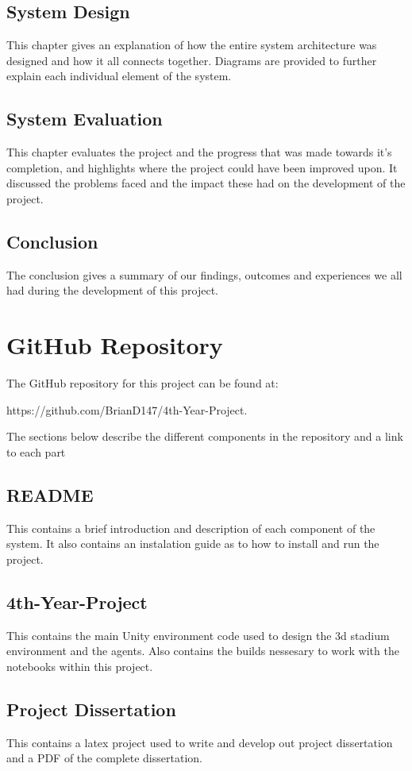 \subsection{System Design}
This chapter gives an explanation of how the entire system architecture was designed and how it all connects together. Diagrams are provided to further explain each individual element of the system.

\subsection{System Evaluation}
This chapter evaluates the project and the progress that was made towards it's completion, and highlights where the project could have been improved upon. It discussed the problems faced and the impact these had on the development of the project.

\subsection{Conclusion}
The conclusion gives a summary of our findings, outcomes and experiences we all had during the development of this project.

\section{GitHub Repository}
The GitHub repository for this project can be found at:

    https://github.com/BrianD147/4th-Year-Project. 

The sections below describe the different components in the repository and a link to each part

\subsection{README}
This contains a brief introduction and description of each component of the system. It also contains an instalation guide as to how to install and run the project.

\subsection{4th-Year-Project}
This contains the main Unity environment code used to design the 3d stadium environment and the agents. Also contains the builds nessesary to work with the notebooks within this project.

\subsection{Project Dissertation}
This contains a latex project used to write and develop out project dissertation and a PDF of the complete dissertation.


